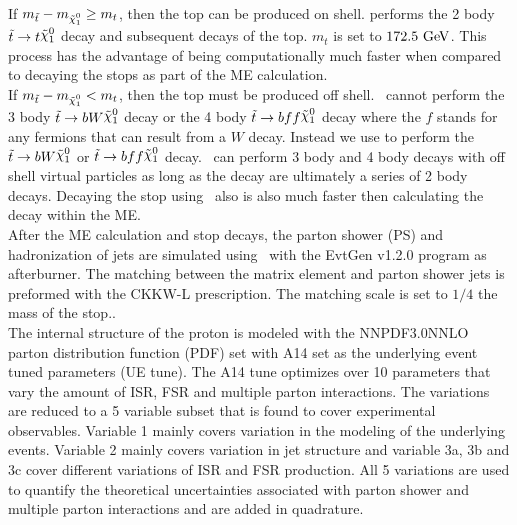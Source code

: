 \indent If $m_{\stop} - m_{\ninoone} \ge m_{t}$, then the top can be produced on shell. \pythiaeight\cite{Pythia8} performs the 2 body ${\stop} \rightarrow t \ninoone$ decay and subsequent decays of the top.  $m_{t}$ is set to $172.5 \gev$.  This process has the advantage of being computationally much faster when compared to decaying the stops as part of the ME calculation.  \\ %

\indent If $m_{\stop} - m_{\ninoone} < m_{t}$, then the top must be produced off shell.   \pythiaeight\ cannot perform the 3 body $\stop \rightarrow b W \ninoone$ decay or the 4 body $\stop \rightarrow b f f \ninoone$ decay where the $f$ stands for any fermions that can result from a $W$ decay.  Instead we use \madspin\cite{Madspin} to perform the $\stop \rightarrow b W \ninoone$ or $\stop \rightarrow b ff \ninoone$ decay.  \madspin\ can perform 3 body and 4 body decays with off shell virtual particles as long as the decay are ultimately a series of 2 body decays.  Decaying the stop using \madspin\ also is also much faster then calculating the decay within the ME.  \\ %

\indent After the ME calculation and stop decays, the parton shower (PS) and hadronization of jets are simulated using \pythiaeight\ with the {\sc EvtGen} v1.2.0 program as afterburner.  The matching between the matrix element and parton shower jets is preformed with the CKKW-L prescription.   The matching scale is set to $1/4$ the mass of the stop.. \\

\indent The internal structure of the proton is modeled with the NNPDF3.0NNLO parton distribution function (PDF) set \cite{NNPDF3.0} with A14 set as the underlying event tuned parameters (UE tune)\cite{Pythia8tunes}.  The A14 tune optimizes over 10 parameters that vary the amount of ISR, FSR and multiple parton interactions.  The variations are reduced to a 5 variable subset that is found to cover experimental observables.  Variable 1 mainly covers variation in the modeling of the underlying events.  Variable 2 mainly covers variation in jet structure and variable 3a, 3b and 3c cover different variations of ISR and FSR production.  All 5 variations are used to quantify the theoretical uncertainties associated with parton shower and multiple parton interactions and are added in quadrature.\\

